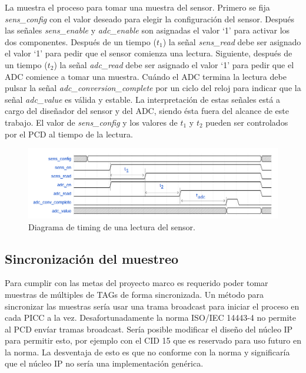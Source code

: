 \documentclass[a4paper, twoside, 11pt]{report}
\begin{document}
La  muestra el proceso para tomar una muestra del sensor. Primero se fija \textit{sens\_config} con el valor deseado para elegir la configuración del sensor. Después las señales \textit{sens\_enable} y \textit{adc\_enable} son asignadas el valor ‘1’ para activar los dos componentes. Después de un tiempo ($t_1$) la señal \textit{sens\_read} debe ser asignado el valor ‘1’ para pedir que el sensor comienza una lectura. Siguiente, después de un tiempo ($t_2$) la señal \textit{adc\_read} debe ser asignado el valor ‘1’ para pedir que el ADC comience a tomar una muestra. Cuándo el ADC termina la lectura debe pulsar la señal \textit{adc\_conversion\_complete} por un ciclo del reloj para indicar que la señal \textit{adc\_value} es válida y estable. La interpretación de estas señales está a cargo del diseñador del sensor y del ADC, siendo ésta fuera del alcance de este trabajo. El valor de \textit{sens\_config} y los valores de $t_1$ y $t_2$ pueden ser controlados por el PCD al tiempo de la lectura.

\begin{figure}[htb]
  \centering
  \includegraphics[width=1.0\textwidth]{./img/sens_adc}
  \caption{Diagrama de timing de una lectura del sensor.}
  \label{fig:sens_adc}
\end{figure}

\FloatBarrier
\subsection{Sincronización del muestreo}

Para cumplir con las metas del proyecto marco es requerido poder tomar muestras de múltiples de TAGs de forma sincronizada. Un método para sincronizar las muestras sería usar una trama broadcast para iniciar el proceso en cada PICC a la vez. Desafortunadamente la norma ISO/IEC 14443-4 no permite al PCD envíar tramas broadcast. Sería posible modificar el diseño del núcleo IP para permitir esto, por ejemplo con el CID 15 que es reservado para uso futuro en la norma. La desventaja de esto es que no conforme con la norma y significaría que el núcleo IP no sería una implementación genérica.
\end{document}
